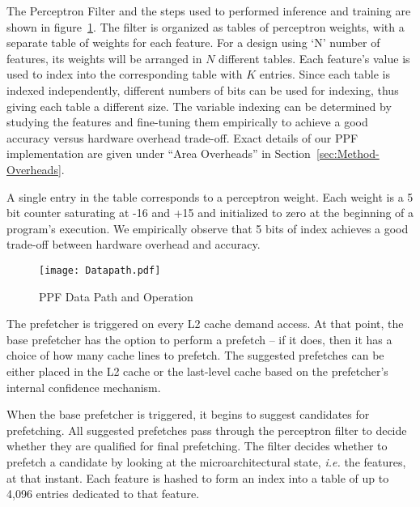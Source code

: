 The Perceptron Filter and the steps used to performed inference 
and training are shown in figure~\ref{fig:PPF_Datapath}. The filter is organized as tables of 
perceptron weights, with a separate table of weights for each feature. 
For a design using `N' number of features, its weights will be arranged
in $N$ different tables. Each feature's value is used to index 
into the corresponding table with $K$ entries.  Since each table is
indexed independently, different numbers of bits can be used for indexing,
thus giving each table a different size.  The variable indexing can be
determined by studying the features and fine-tuning them empirically to
achieve a good accuracy versus hardware overhead trade-off.  Exact details of
our PPF implementation are given under ``Area Overheads'' in
Section~\ref{sec:Method-Overheads}.

A single entry in the table corresponds to a perceptron weight.  Each weight
is a 5 bit counter saturating at -16 and +15 and initialized to zero at the
beginning of a program's execution. We empirically observe that 5 bits of
index achieves a good trade-off between hardware overhead and accuracy.\newline

\begin{figure}
  \begin{center}
  \texttt{[image: Datapath.pdf]}
    \label{fig:PPF_Datapath}
  \caption{PPF Data Path and Operation}
  \end{center}
\end{figure}


\newline 

The prefetcher is triggered on every L2 cache
demand access.  At that point, the base prefetcher has the option to perform a
prefetch -- if it does, then it has a choice of how many cache lines to
prefetch.  The suggested prefetches can be either placed in the L2 cache or
the last-level cache based on the prefetcher's internal confidence mechanism.

When the base prefetcher is triggered, it begins to suggest candidates for
prefetching.  All suggested prefetches pass through the perceptron
filter to decide whether they are qualified for final prefetching.  The filter
decides whether to prefetch a candidate by looking at the microarchitectural
state, \textit{i.e.} the features, at that instant.  Each feature is hashed to
form an index into a table of up to 4,096 entries dedicated to that feature.

